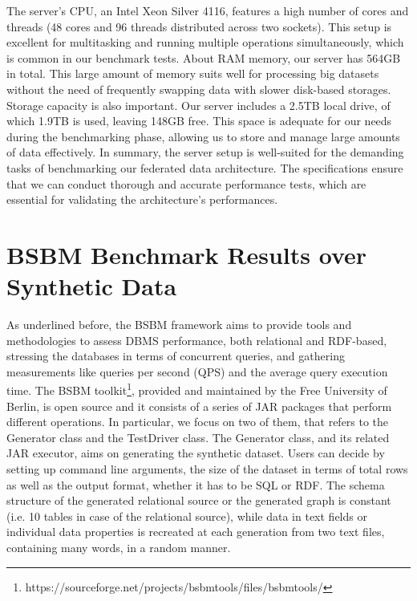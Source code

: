 The server's CPU, an Intel Xeon Silver 4116, features a high number of cores and threads (48 cores and 96 threads distributed across two sockets). This setup is excellent for multitasking and running multiple operations simultaneously, which is common in our benchmark tests.
About \ac{RAM} memory, our server has 564GB in total. This large amount of memory suits well for processing big datasets without the need of frequently swapping data with slower disk-based storages.
Storage capacity is also important. Our server includes a 2.5TB local drive, of which 1.9TB is used, leaving 148GB free. This space is adequate for our needs during the benchmarking phase, allowing us to store and manage large amounts of data effectively.
In summary, the server setup is well-suited for the demanding tasks of benchmarking our federated data architecture. The specifications ensure that we can conduct thorough and accurate performance tests, which are essential for validating the architecture's performances.


\section{BSBM Benchmark Results over Synthetic Data}
As underlined before, the \ac{BSBM} framework aims to provide tools and methodologies to assess \ac{DBMS} performance, both relational and RDF-based, stressing the databases in terms of concurrent queries, and gathering measurements like queries per second (QPS) and the average query execution time.
The \ac{BSBM}  toolkit\footnote{https://sourceforge.net/projects/bsbmtools/files/bsbmtools/}, provided and maintained by the Free University of Berlin, is open source and it consists of a series of \ac{JAR} packages that perform different operations.
In particular, we focus on two of them, that refers to the Generator class and the TestDriver class. The Generator class, and its related \ac{JAR} executor, aims on generating the synthetic dataset. Users can decide by setting up command line arguments, the size of the dataset in terms of total rows as well as the output format, whether it has to be \ac{SQL} or \ac{RDF}. The schema structure of the generated relational source or the generated graph is constant (i.e. 10 tables in case of the relational source), while data in text fields or individual data properties is recreated at each generation from two text files, containing many words, in a random manner.

